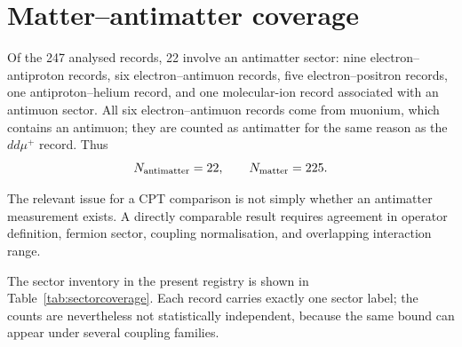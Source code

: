 \documentclass[aps,prd,reprint,superscriptaddress,nofootinbib]{revtex4-2}
\begin{document}
	\section{Matter--antimatter coverage}
	
	Of the 247 analysed records, 22 involve an antimatter sector: nine
electron--antiproton records, six electron--antimuon records, five
electron--positron records, one antiproton--helium record, and one
molecular-ion record associated with an antimuon sector. All six
electron--antimuon records come from muonium, which contains an
antimuon; they are counted as antimatter for the same reason as the
$dd\mu^+$ record. Thus
	\begin{equation}
		N_{\rm antimatter}=22,
		\qquad
		N_{\rm matter}=225.
		\label{eq:mattercounts}
	\end{equation}
	
	The relevant issue for a CPT comparison is not simply whether an
	antimatter measurement exists. A directly comparable result requires
	agreement in operator definition, fermion sector, coupling
	normalisation, and overlapping interaction range.
	
	The sector inventory in the present registry is shown in
	Table~\ref{tab:sectorcoverage}. Each record carries exactly one sector label; the counts are nevertheless not statistically independent, because the same bound can appear under several coupling families.
	
\end{document}
